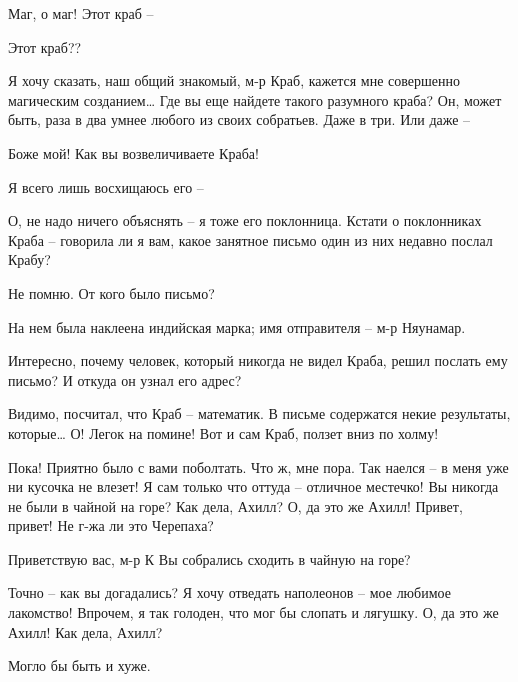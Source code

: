 \documentclass[../main.tex]{subfiles}
\begin{document}


\begin{dialogue}

 Маг, о маг! Этот краб \---

 Этот краб??

 Я хочу сказать, наш общий знакомый, м-р Краб, кажется мне совершенно магическим созданием\ldots{} Где вы еще найдете такого разумного краба? Он, может быть, раза в два умнее любого из своих собратьев. Даже в три. Или даже \---

 Боже мой! Как вы возвеличиваете Краба!

 Я всего лишь восхищаюсь его \---

 О, не надо ничего объяснять \--- я тоже его поклонница. Кстати о поклонниках Краба \--- говорила ли я вам, какое занятное письмо один из них недавно послал Крабу?

 Не помню. От кого было письмо?

 На нем была наклеена индийская марка; имя отправителя \--- м-р Няунамар.

 Интересно, почему человек, который никогда не видел Краба, решил послать ему письмо? И откуда он узнал его адрес?

 Видимо, посчитал, что Краб \--- математик. В письме содержатся некие результаты, которые\ldots{} О! Легок на помине! Вот и сам Краб, ползет вниз по холму!

 Пока! Приятно было с вами поболтать. Что ж, мне пора. Так наелся \--- в меня уже ни кусочка не влезет! Я сам только что оттуда \--- отличное местечко! Вы никогда не были в чайной на горе? Как дела, Ахилл? О, да это же Ахилл! Привет, привет! Не г-жа ли это Черепаха?

 Приветствую вас, м-р К Вы собрались сходить в чайную на горе?

 Точно \--- как вы догадались? Я хочу отведать наполеонов \--- мое любимое лакомство! Впрочем, я так голоден, что мог бы слопать и лягушку. О, да это же Ахилл! Как дела, Ахилл?

 Могло бы быть и хуже.


\end{dialogue}
\end{document}
